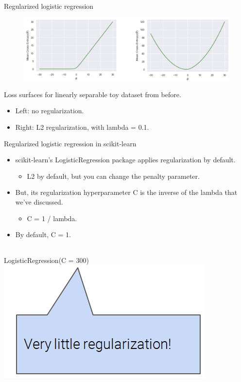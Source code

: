 \documentclass[aspectratio=169]{../latex_main/tntbeamer}  %
\begin{document}
	 
	 \begin{frame}{Regularized logistic regression}
	    \begin{figure}
	        \centering
	        \includegraphics[scale=.4]{Bild47}
	    \end{figure}
	     Loss surfaces for linearly separable toy dataset from before.
	     \begin{itemize}
	         \item Left: no regularization.
	         \item Right: L2 regularization, with lambda = 0.1.
	     \end{itemize}
	 \end{frame}
	 
	 
	 \begin{frame}{Regularized logistic regression in scikit-learn}
	    \begin{itemize}
	        \item scikit-learn’s LogisticRegression package applies regularization by default.
	        \begin{itemize}
	            \item L2 by default, but you can change the penalty parameter.
	        \end{itemize}
	        \item But, its regularization hyperparameter C is the inverse of the lambda that we’ve discussed.
	        \begin{itemize}
	            \item C = 1 / lambda.
	        \end{itemize}
	        \item By default, C = 1.
	    \end{itemize}
	    
	   \\
	   \bigskip
	   LogisticRegression(C = 300)\\
	   \includegraphics[scale=.5]{Bild48}

	 \end{frame}
\end{document}
